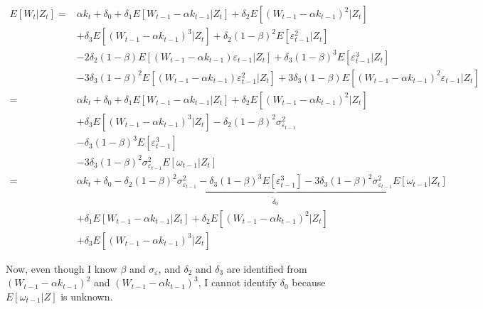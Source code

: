 \documentclass[
  letterpaper,
  DIV=11,
  numbers=noendperiod]{scrartcl}
\begin{document}
\[
\begin{aligned}
E[W_t|Z_t] =&\alpha k_t + \delta_0 + \delta_1 E[W_{t-1}-\alpha k_{t-1}|Z_t]+ \delta_2 E[\left(W_{t-1}-\alpha k_{t-1}\right)^2|Z_t] \\
    &+ \delta_3 E[\left(W_{t-1}-\alpha k_{t-1}\right)^3|Z_t] + \delta_2(1-\beta)^2E[\varepsilon_{t-1}^2|Z_t] \\
    &- 2\delta_2(1-\beta)E[\left(W_{t-1}-\alpha k_{t-1}\right)\varepsilon_{t-1}|Z_t] + \delta_3(1-\beta)^3E[\varepsilon_{t-1}^3|Z_t] \\
    &- 3\delta_3(1-\beta)^2E[\left(W_{t-1}-\alpha k_{t-1}\right)\varepsilon_{t-1}^2|Z_t] + 3\delta_3(1-\beta)E[\left(W_{t-1}-\alpha k_{t-1}\right)^2\varepsilon_{t-1}|Z_t] \\
    =&\alpha k_t + \delta_0 + \delta_1 E[W_{t-1}-\alpha k_{t-1}|Z_t]+ \delta_2 E[\left(W_{t-1}-\alpha k_{t-1}\right)^2|Z_t] \\
    &+ \delta_3 E[\left(W_{t-1}-\alpha k_{t-1}\right)^3|Z_t] - \delta_2(1-\beta)^2\sigma_{\varepsilon_{t-1}}^2 \\
    &- \delta_3(1-\beta)^3E[\varepsilon_{t-1}^3] \\
    &- 3\delta_3(1-\beta)^2\sigma^2_{\varepsilon_{t-1}}E[\omega_{t-1}|Z_t] \\
    =&\alpha k_t + \underbrace{\delta_0 - \delta_2(1-\beta)^2\sigma_{\varepsilon_{t-1}}^2 - \delta_3(1-\beta)^3E[\varepsilon_{t-1}^3] - 3\delta_3(1-\beta)^2\sigma^2_{\varepsilon_{t-1}}E[\omega_{t-1}|Z_t]}_{\tilde \delta_0} \\
    &+\delta_1 E[W_{t-1}-\alpha k_{t-1}|Z_t]+ \delta_2 E[\left(W_{t-1}-\alpha k_{t-1}\right)^2|Z_t] \\
    &+ \delta_3 E[\left(W_{t-1}-\alpha k_{t-1}\right)^3|Z_t] 
\end{aligned}
\]

Now, even though I know \(\beta\) and \(\sigma_{\varepsilon}\), and
\(\delta_2\) and \(\delta_3\) are identified from
\(\left(W_{t-1}-\alpha k_{t-1}\right)^2\) and
\(\left(W_{t-1}-\alpha k_{t-1}\right)^3\), I cannot identify
\(\delta_0\) because \(E[\omega_{t-1}|Z]\) is unknown.
\end{document}
